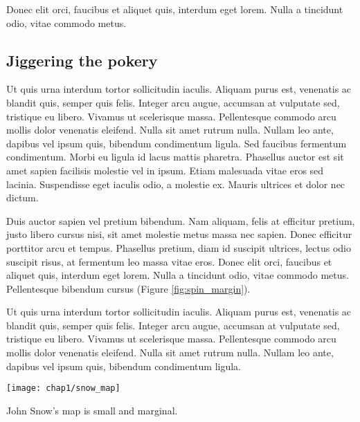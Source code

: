 Donec elit orci, faucibus et aliquet quis, interdum eget lorem. Nulla a tincidunt odio, vitae commodo metus.

\subsection{Jiggering the pokery}

 Ut quis urna interdum tortor sollicitudin iaculis. Aliquam purus est, venenatis ac blandit quis, semper quis felis. Integer arcu augue, accumsan at vulputate sed, tristique eu libero. Vivamus ut scelerisque massa. Pellentesque commodo arcu mollis dolor venenatis eleifend. Nulla sit amet rutrum nulla. Nullam leo ante, dapibus vel ipsum quis, bibendum condimentum ligula. Sed faucibus fermentum condimentum. Morbi eu ligula id lacus mattis pharetra. Phasellus auctor est sit amet sapien facilisis molestie vel in ipsum. Etiam malesuada vitae eros sed lacinia. Suspendisse eget iaculis odio, a molestie ex. Mauris ultrices et dolor nec dictum.\autocite{Rolph2015,Couderc2015}

Duis auctor sapien vel pretium bibendum. Nam aliquam, felis at efficitur pretium, justo libero cursus nisi, sit amet molestie metus massa nec sapien. Donec efficitur porttitor arcu et tempus. Phasellus pretium, diam id suscipit ultrices, lectus odio suscipit risus, at fermentum leo massa vitae eros. Donec elit orci, faucibus et aliquet quis, interdum eget lorem. Nulla a tincidunt odio, vitae commodo metus. Pellentesque bibendum cursus (Figure \ref{fig:spin_margin}).

Ut quis urna interdum tortor sollicitudin iaculis. Aliquam purus est, venenatis ac blandit quis, semper quis felis. Integer arcu augue, accumsan at vulputate sed, tristique eu libero. Vivamus ut scelerisque massa. Pellentesque commodo arcu mollis dolor venenatis eleifend. Nulla sit amet rutrum nulla. Nullam leo ante, dapibus vel ipsum quis, bibendum condimentum ligula.

\begin{marginfigure}
  \texttt{[image: chap1/snow\_map]}  
  \caption{John Snow's map is small and marginal.}
  \label{fig:spin_margin}
\end{marginfigure}
